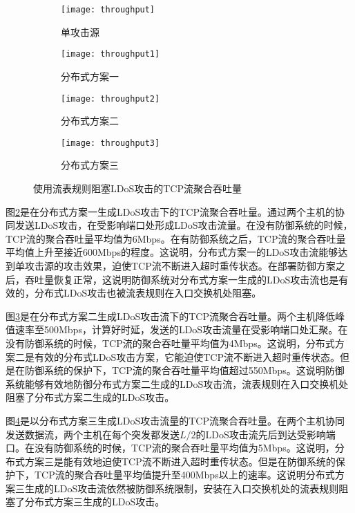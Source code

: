 \begin{figure}
    \begin{subfigure}{.49\textwidth}
        \centering
        \texttt{[image: throughput]}
        \caption{单攻击源}
        \label{fig:throughput-single}
    \end{subfigure}
    \begin{subfigure}{.49\textwidth}
        \centering
        \texttt{[image: throughput1]}
        \caption{分布式方案一}
        \label{fig:throughput-2h-mod1}
    \end{subfigure}

    \begin{subfigure}{.49\textwidth}
        \centering
        \texttt{[image: throughput2]}
        \caption{分布式方案二}
        \label{fig:throughput-2h-mod2}
    \end{subfigure}
    \begin{subfigure}{.49\textwidth}
        \centering
        \texttt{[image: throughput3]}
        \caption{分布式方案三}
        \label{fig:throughput-2h-mod3}
    \end{subfigure}


    \caption{使用流表规则阻塞LDoS攻击的TCP流聚合吞吐量}
    \label{fig:throughput-all}
\end{figure}

图\ref{fig:throughput-2h-mod1}是在分布式方案一生成LDoS攻击下的TCP流聚合吞吐量。通过两个主机的协同发送LDoS攻击，在受影响端口处形成LDoS攻击流量。在没有防御系统的时候，TCP流的聚合吞吐量平均值为6Mbps。在有防御系统之后，TCP流的聚合吞吐量平均值上升至接近600Mbps的程度。这说明，分布式方案一的LDoS攻击流能够达到单攻击源的攻击效果，迫使TCP流不断进入超时重传状态。在部署防御方案之后，吞吐量恢复正常，这说明防御系统对分布式方案一生成的LDoS攻击流也是有效的，分布式LDoS攻击也被流表规则在入口交换机处阻塞。

图\ref{fig:throughput-2h-mod2}是在分布式方案二生成LDoS攻击流下的TCP流聚合吞吐量。两个主机降低峰值速率至500Mbps，计算好时延，发送的LDoS攻击流量在受影响端口处汇聚。在没有防御系统的时候，TCP流的聚合吞吐量平均值为4Mbps。这说明，分布式方案二是有效的分布式LDoS攻击方案，它能迫使TCP流不断进入超时重传状态。但是在防御系统的保护下，TCP流的聚合吞吐量平均值超过550Mbps。这说明防御系统能够有效地防御分布式方案二生成的LDoS攻击流，流表规则在入口交换机处阻塞了分布式方案二生成的LDoS攻击。

图\ref{fig:throughput-2h-mod3}是以分布式方案三生成LDoS攻击流量的TCP流聚合吞吐量。在两个主机协同发送数据流，两个主机在每个突发都发送$L/2$的LDoS攻击流先后到达受影响端口。在没有防御系统的时候，TCP流的聚合吞吐量平均值为5Mbps。这说明，分布式方案三是能有效地迫使TCP流不断进入超时重传状态。但是在防御系统的保护下，TCP流的聚合吞吐量平均值提升至400Mbps以上的速率。这说明分布式方案三生成的LDoS攻击流依然被防御系统限制，安装在入口交换机处的流表规则阻塞了分布式方案三生成的LDoS攻击。

